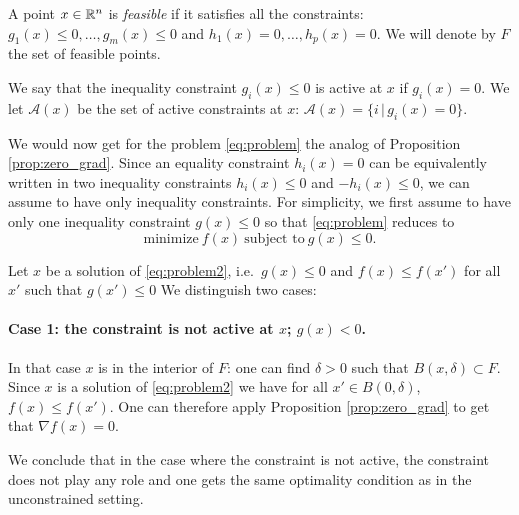 \documentclass[11pt,nocut]{article}
\begin{document}
\begin{definition}
	A point $x \in \mathbb{R}^n$ is \emph{feasible} if it satisfies all the constraints: $g_1(x) \leq 0, \dots, g_m(x)\leq  0$ and $h_1(x) = 0, \dots, h_p(x) = 0$. We will denote by $F$ the set of feasible points.
\end{definition}

\begin{definition}
	We say that the inequality constraint $g_i(x) \leq 0$ is active at $x$ if $g_i(x) = 0$.
	We let $\mathcal{A}(x)$ be the set of active constraints at $x$: $\mathcal{A}(x) = \{ i \, | \, g_i(x) = 0\}$.
\end{definition}
We would now get for the problem \eqref{eq:problem} the analog of Proposition \ref{prop:zero_grad}.
Since an equality constraint $h_i(x) = 0$ can be equivalently written in two inequality constraints $h_i(x) \leq 0$ and $-h_i(x) \leq 0$, we can assume to have only inequality constraints.
For simplicity, we first assume to have only one inequality constraint $g(x) \leq 0$ so that \eqref{eq:problem} reduces to
\begin{equation}\label{eq:problem2}
	\text{minimize} \ f(x) \ \text{subject to} \ g(x) \leq 0.
\end{equation}


Let $x$ be a solution of \eqref{eq:problem2}, i.e.\ $g(x) \leq 0$ and $f(x) \leq f(x')$ for all $x'$ such that $g(x')\leq0$
We distinguish two cases:

\paragraph{Case 1: the constraint is not active at $x$; $g(x) <0$.} In that case $x$ is in the interior of $F$: one can find $\delta > 0$ such that $B(x,\delta) \subset F$. Since $x$ is a solution of \eqref{eq:problem2} we have for all $x' \in B(0,\delta)$, $f(x) \leq f(x')$. One can therefore apply Proposition \ref{prop:zero_grad} to get that $\nabla f(x) = 0$.

We conclude that in the case where the constraint is not active, the constraint does not play any role and one gets the same optimality condition as in the unconstrained setting.
\end{document}
